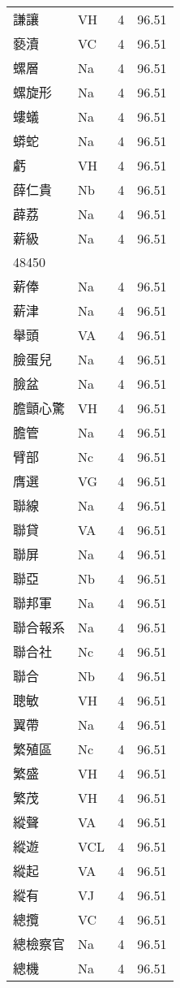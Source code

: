 \documentclass[twocolumn]{book}
\begin{document}
\begin{supertabular}{llrr}
謙讓 & VH & 4 &  96.51\\
褻瀆 & VC & 4 &  96.51\\
螺層 & Na & 4 &  96.51\\
螺旋形 & Na & 4 &  96.51\\
螻蟻 & Na & 4 &  96.51\\
蟒蛇 & Na & 4 &  96.51\\
虧 & VH & 4 &  96.51\\
薛仁貴 & Nb & 4 &  96.51\\
薜荔 & Na & 4 &  96.51\\
薪級 & Na & 4 &  96.51\\
48450\\
薪俸 & Na & 4 &  96.51\\
薪津 & Na & 4 &  96.51\\
舉頭 & VA & 4 &  96.51\\
臉蛋兒 & Na & 4 &  96.51\\
臉盆 & Na & 4 &  96.51\\
膽顫心驚 & VH & 4 &  96.51\\
膽管 & Na & 4 &  96.51\\
臂部 & Nc & 4 &  96.51\\
膺選 & VG & 4 &  96.51\\
聯線 & Na & 4 &  96.51\\
聯貸 & VA & 4 &  96.51\\
聯屏 & Na & 4 &  96.51\\
聯亞 & Nb & 4 &  96.51\\
聯邦軍 & Na & 4 &  96.51\\
聯合報系 & Na & 4 &  96.51\\
聯合社 & Nc & 4 &  96.51\\
聯合 & Nb & 4 &  96.51\\
聰敏 & VH & 4 &  96.51\\
翼帶 & Na & 4 &  96.51\\
繁殖區 & Nc & 4 &  96.51\\
繁盛 & VH & 4 &  96.51\\
繁茂 & VH & 4 &  96.51\\
縱聲 & VA & 4 &  96.51\\
縱遊 & VCL & 4 &  96.51\\
縱起 & VA & 4 &  96.51\\
縱有 & VJ & 4 &  96.51\\
總攬 & VC & 4 &  96.51\\
總檢察官 & Na & 4 &  96.51\\
總機 & Na & 4 &  96.51\\

\end{supertabular}
\end{document}
